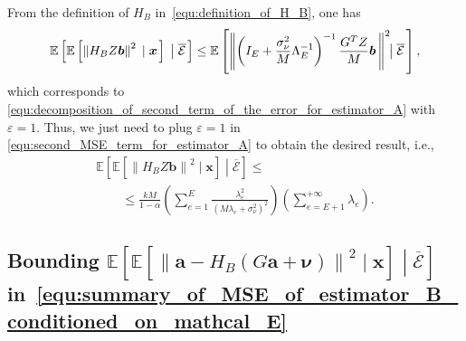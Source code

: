 \documentclass[10pt,twocolumn,twoside]{IEEEtran}					%
\theoremstyle	{plain}
\newcommand{\Expectation}					[0]	{\mathbb{E}}
\newcommand{\ExpectationOf}					[1]	{\Expectation \left[ #1 \right]}
\newcommand{\ExpectationOfGiven}			[2]	{\ExpectationOf{ #1 \; \left| \; #2 \right. }}
\begin{document}
From the definition of $H_{B}$ in~\eqref{equ:definition_of_H_B}, one has
%
\begin{equation}\footnotesize
	\ExpectationOfGiven{ \ExpectationOfGiven{\left\| H_{B} Z \bm{b} \right\|^{2}}{\bm{x}} }{\overline{\mathcal{E}}}
	\leq
	\ExpectationOfGiven
	{
		\left\|
		\left( I_{E} + \frac{\sigma^{2}_{\nu}}{M} \Lambda^{-1}_{E} \right)^{-1}
			\frac{G^{T} Z}{M} \bm{b} \,
		\right\|^{2}
		\hspace{-0.2cm}
	}
	{\overline{\mathcal{E}}} ,
	\label{equ:decomposition_of_second_term_of_the_error_for_estimator_B}
\end{equation}
%
which corresponds to \eqref{equ:decomposition_of_second_term_of_the_error_for_estimator_A} with $\varepsilon = 1$. Thus, we just need to plug $\varepsilon = 1$ in \eqref{equ:second_MSE_term_for_estimator_A} to obtain the desired result, i.e.,
%
\begin{equation}
	\begin{array}{l}
		\displaystyle
		\ExpectationOfGiven{ \ExpectationOfGiven{\left\| H_{B} Z \bm{b} \right\|^{2}}{\bm{x}} }{\overline{\mathcal{E}}} \leq \\
		\qquad \leq \displaystyle
		\frac{k M}{1 - \alpha}
		\left(
			\sum_{e = 1}^{E} \frac{\lambda_{e}^{2}}{\left( M \lambda_{e} + \sigma^{2}_{\nu} \right)^{2}}
		\right)
		\left( \sum_{e = E + 1}^{+\infty} \lambda_{e} \right) .
	\end{array}
	\label{equ:second_MSE_term_for_estimator_B}
\end{equation}


\subsection*{Bounding $\ExpectationOfGiven{ \ExpectationOfGiven{ \left\| \bm{a} - H_{B} ( G \bm{a} + \bm{\nu} ) \right\|^{2}}{\bm{x}} }{\overline{\mathcal{E}}}$ in~\eqref{equ:summary_of_MSE_of_estimator_B_conditioned_on_mathcal_E}}
\label{ssec:characterization_of_second_term_of_f_B_conditioned_on_mathcal_E}
\end{document}
